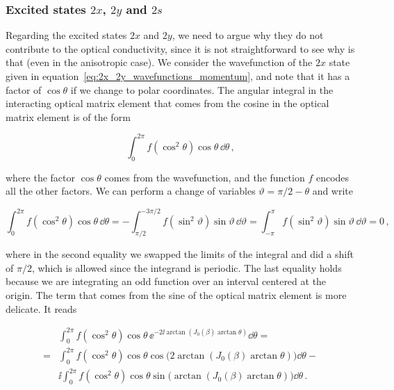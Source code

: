 \subsubsection{Excited states $2x$, $2y$ and $2s$}
\label{subsubsec:excited_states_2x_2y}

Regarding the excited states $2x$ and $2y$, we need to argue why they do not contribute to the optical conductivity, since it is not straightforward to see why is that (even in the anisotropic case).
We consider the wavefunction of the $2x$ state given in equation~\eqref{eq:2x_2y_wavefunctions_momentum}, and note that it has a factor of $\cos \theta$ if we change to polar coordinates.
The angular integral in the interacting optical matrix element that comes from the cosine in the optical matrix element is of the form

\begin{equation}
    \int_0^{2 \pi} f(\cos^2 \theta) \cos \theta\, \dd \theta\,,
\end{equation}

\noindent where the factor $\cos \theta$ comes from the wavefunction, and the function $f$ encodes all the other factors.
We can perform a change of variables $\vartheta = \pi/2 - \theta$ and write

\begin{equation}
    \int_0^{2 \pi} f(\cos^2 \theta) \cos \theta \, \dd \theta = -\int_{\pi/2}^{- 3 \pi/2}  f(\sin^2 \vartheta) \sin \vartheta\, \dd \vartheta =\int_{-\pi}^{\pi}  f(\sin^2 \vartheta) \sin \vartheta\, \dd \vartheta = 0\,,
\end{equation}

\noindent where in the second equality we swapped the limits of the integral and did a shift of $\pi/2$, which is allowed since the integrand is periodic.
The last equality holds because we are integrating an odd function over an interval centered at the origin.
The term that comes from the sine of the optical matrix element is more delicate.
It reads

\begin{equation}
    \begin{aligned}
         &\int_0^{2 \pi} f(\cos^2 \theta) \cos \theta\, \ee^{-2\ii\arctan\left(J_{0}(\beta)\arctan\theta\right)} \dd \theta = \\
        =&\int_0^{2 \pi} f(\cos^2 \theta) \cos \theta \cos\!\big(2\arctan\left(J_{0}(\beta)\arctan\theta\right)\big) \dd \theta - \\
         &\ii \int_0^{2 \pi} f(\cos^2 \theta) \cos \theta \sin\!\big(\arctan\left(J_{0}(\beta)\arctan\theta\right)\big) \dd \theta\,.
    \end{aligned}
\end{equation}

